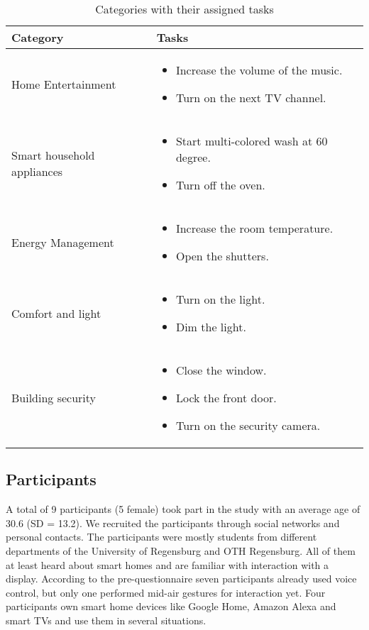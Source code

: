 \documentclass[sigchi]{acmart}
\begin{document}
\begin{table*}[]
\caption{Categories with their assigned tasks}
\label{tab:tasks}
\begin{tabular}{|l|p{}|}
\hline
\textbf{Category}          & \textbf{Tasks} \\ \hline
Home Entertainment         & \begin{itemize}
							 \item Increase the volume of the music.
							 \item Turn on the next TV channel.  
							 \end{itemize} \\ \hline
Smart household appliances & \begin{itemize}
							 \item Start multi-colored wash at 60 degree.
							 \item Turn off the oven.   
							 \end{itemize} \\ \hline
Energy Management          & \begin{itemize}
							 \item Increase the room temperature.   
							 \item Open the shutters.    
							 \end{itemize} \\ \hline
Comfort and light          & \begin{itemize}
							 \item Turn on the light.      
							 \item Dim the light.          
							 \end{itemize} \\ \hline
Building security          & \begin{itemize}
							 \item Close the window.     
							 \item Lock the front door. 
							 \item  Turn on the security camera.
							 \end{itemize} \\ \hline
\end{tabular}
\end{table*}

\subsection{Participants}
A total of 9 participants (5 female) took part in the study with an average age of 30.6 (SD = 13.2). We recruited the participants through social networks and personal contacts. The participants were mostly students from different departments of the University of Regensburg and OTH Regensburg. All of them at least heard about smart homes and are familiar with interaction with a display. According to the pre-questionnaire seven participants already used voice control, but only one performed mid-air gestures for interaction yet. Four participants own smart home devices like Google Home, Amazon Alexa and smart TVs and use them in several situations.
\end{document}
